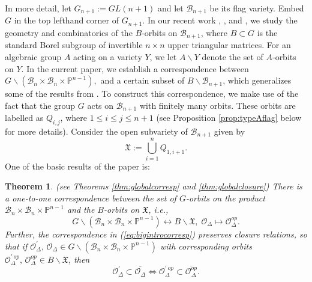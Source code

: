 \documentclass[12pt]{amsart}
\numberwithin{equation}{section}
\newtheorem{thm}{Theorem}[section]
\newcommand{\B}{\mathcal{B}}
\newcommand{\calO}{\mathcal{O}}
\begin{document}

In more detail, let $G_{n+1}:=GL(n+1)$ and let $\B_{n+1}$ be its flag variety.  Embed $G$ in the top lefthand corner of $G_{n+1}$.  In our recent work \cite{CE21I}, \cite{CE21II}, and \cite{Shpairs}, we study the 
geometry and combinatorics of the $B$-orbits on $\B_{n+1}$, where $B\subset G$ is the standard Borel subgroup of invertible $n\times n$ upper triangular matrices.  For an algebraic group $A$ acting on a variety $Y$, we let $A\backslash Y$ denote the set of $A$-orbits on $Y.$  In the current paper, we establish a correspondence between  $G\backslash(\B_{n}\times\B_{n}\times\mathbb{P}^{n-1}),$  and a certain subset of $B\backslash\B_{n+1}$, which generalizes some of the results from \cite{CE21I}.  
To construct this correspondence, we make use of the fact that the group $G$ acts on $\B_{n+1}$ with finitely many orbits.  These orbits are labelled as $Q_{i,j}$, where $1\leq i\leq j\leq n+1$ (see Proposition \ref{prop:typeAflag} below for more details).  Consider the open subvariety of $\B_{n+1}$ given by 
\begin{equation}\label{eq:introXdefn}
\mathfrak{X}:=\displaystyle\bigcup_{i=1}^{n} Q_{1,i+1}.
\end{equation}
 One of the basic results of the paper is: 
\begin{thm}\label{thm:introthmbig}(see Theorems \ref{thm:globalcorresp} and \ref{thm:globalclosure})
There is a one-to-one correspondence between the set of $G$-orbits on the product $\B_{n}\times\B_{n}\times\mathbb{P}^{n-1}$ and the $B$-orbits on $\mathfrak{X}$, i.e.,
\begin{equation}\label{eq:bigintrocorresp}
G\backslash(\B_{n}\times\B_{n}\times\mathbb{P}^{n-1})\longleftrightarrow B\backslash\mathfrak{X},\; \calO_{\Delta}\mapsto \calO_{\Delta}^{op}. 
\end{equation}
Further, the correspondence in (\ref{eq:bigintrocorresp}) preserves closure relations, so that if $\calO_{\Delta}^{\prime},\, \calO_{\Delta}\in G\backslash(\B_{n}\times\B_{n}\times\mathbb{P}^{n-1})$ with corresponding orbits $\calO_{\Delta}^{\prime\, op}, \, \calO_{\Delta}^{op}\in B\backslash\mathfrak{X} $, then 
\begin{equation}\label{eq:introclosure}
\calO_{\Delta}^{\prime}\subset\overline{\calO_{\Delta}}\Leftrightarrow\calO_{\Delta}^{\prime\, op}\subset \overline{\calO_{\Delta}^{op}}.
\end{equation}
\end{thm} 
\end{document}
